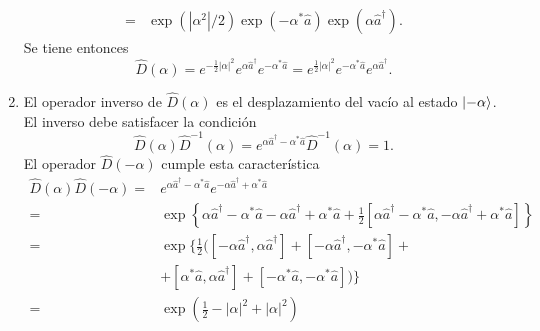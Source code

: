 \begin{enumerate}
\begin{align}
          =                 & \exp(|\alpha^2|/2)\exp(-\alpha^{*} \hat{a})\exp(\alpha\hat{a}^{\dagger}).
        \end{align}
        Se tiene entonces
        \begin{equation}
          \hat{D}(\alpha)=e^{-\frac{1}{2}|\alpha|^2} e^{\alpha \hat{a}^\dagger} e^{-\alpha^* \hat{a}}  = e^{\frac{1}{2}|\alpha|^2} e^{-\alpha^* \hat{a}} e^{\alpha \hat{a}^\dagger}.
        \end{equation}
  \item El operador inverso de $\hat{D}(\alpha)$ es el desplazamiento del vacío al estado $\ket{-\alpha}$. El inverso debe satisfacer la condición
        \begin{equation}
          \hat{D}(\alpha)\hat{D}^{-1}(\alpha) = e^{\alpha \hat{a}^{\dagger} - \alpha^{*}\hat{a}} \hat{D}^{-1}(\alpha) = 1.
        \end{equation}
        El operador $\hat{D}(-\alpha)$ cumple esta característica
        \begin{align}
          \hat{D}(\alpha) \hat{D}(-\alpha) = & e^{\alpha \hat{a}^{\dagger} - \alpha^{*} \hat{a}} e^{-\alpha \hat{a}^{\dagger} + \alpha^{*} \hat{a}}                                                                                                                                                 \nonumber \\
          =                                  & \exp{\left\{ \alpha \hat{a}^{\dagger} - \alpha^{*} \hat{a} -\alpha \hat{a}^{\dagger} + \alpha^{*} \hat{a} + \frac{1}{2}[ \alpha \hat{a}^{\dagger} - \alpha^{*} \hat{a}, -\alpha \hat{a}^{\dagger} + \alpha^{*} \hat{a} ] \right\}}                   \nonumber \\
          =                                  & \exp \Bigg\{ \frac{1}{2}\bigg( [-\alpha \hat{a}^{\dagger}, \alpha\hat{a}^{\dagger}] + [-\alpha \hat{a}^{\dagger}, -\alpha^{*} \hat{a}] +                                                                                                             \nonumber \\
                                             & + [\alpha^{*} \hat{a}, \alpha\hat{a}^{\dagger}] + [-\alpha^{*} \hat{a}, -\alpha^{*}\hat{a}] \bigg) \Bigg\}                                                                                                                                          \nonumber  \\
          =                                  & \exp{(\frac{1}{2}- |\alpha|^2 + |\alpha|^2)}                                                                                                                                                                                                         \nonumber \\

\end{align}
\end{enumerate}
